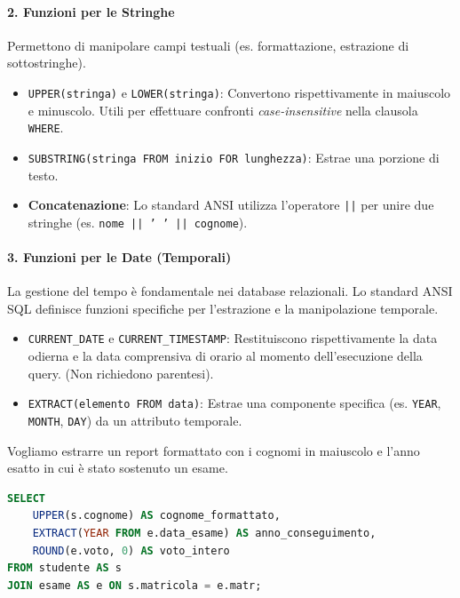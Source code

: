 \paragraph{2. Funzioni per le Stringhe}
Permettono di manipolare campi testuali (es. formattazione, estrazione di sottostringhe).
\begin{itemize}
    \item \texttt{UPPER(stringa)} e \texttt{LOWER(stringa)}: Convertono rispettivamente in maiuscolo e minuscolo. Utili per effettuare confronti \textit{case-insensitive} nella clausola \texttt{WHERE}.
    \item \texttt{SUBSTRING(stringa FROM inizio FOR lunghezza)}: Estrae una porzione di testo.
    \item \textbf{Concatenazione}: Lo standard ANSI utilizza l'operatore \texttt{||} per unire due stringhe (es. \texttt{nome || ' ' || cognome}).
\end{itemize}

\paragraph{3. Funzioni per le Date (Temporali)}
La gestione del tempo è fondamentale nei database relazionali. Lo standard ANSI SQL definisce funzioni specifiche per l'estrazione e la manipolazione temporale.
\begin{itemize}
    \item \texttt{CURRENT\_DATE} e \texttt{CURRENT\_TIMESTAMP}: Restituiscono rispettivamente la data odierna e la data comprensiva di orario al momento dell'esecuzione della query. (Non richiedono parentesi).
    \item \texttt{EXTRACT(elemento FROM data)}: Estrae una componente specifica (es. \texttt{YEAR}, \texttt{MONTH}, \texttt{DAY}) da un attributo temporale.
\end{itemize}

\begin{example}
Vogliamo estrarre un report formattato con i cognomi in maiuscolo e l'anno esatto in cui è stato sostenuto un esame.
\begin{lstlisting}[language=SQL, basicstyle=\ttfamily\small, keywordstyle=\color{blue}\bfseries]
SELECT 
    UPPER(s.cognome) AS cognome_formattato,
    EXTRACT(YEAR FROM e.data_esame) AS anno_conseguimento,
    ROUND(e.voto, 0) AS voto_intero
FROM studente AS s
JOIN esame AS e ON s.matricola = e.matr;
\end{lstlisting}
\end{example}

